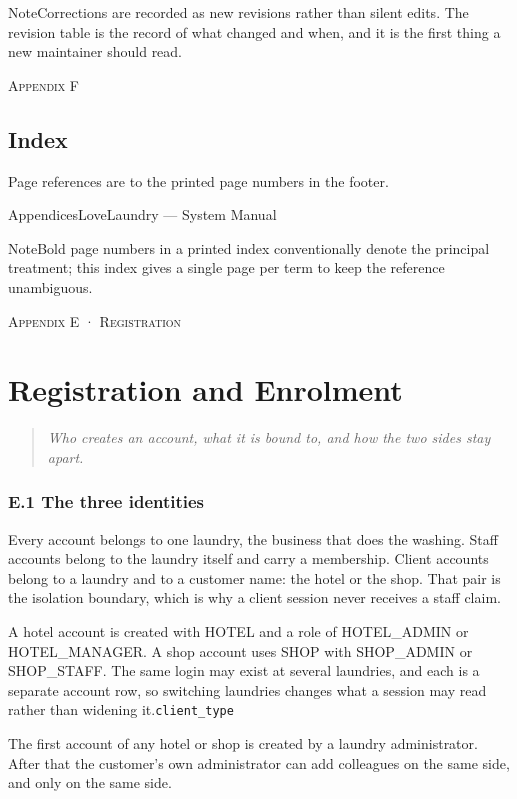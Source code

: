 \documentclass[11pt,a4paper,oneside]{book}
\begin{document}
\begin{notebox}NoteCorrections are recorded as new revisions rather than silent edits. The revision table is the record of what changed and when, and it is the first thing a new maintainer should read.\end{notebox}
\textsc{\small\color{crimson}Appendix F}\par\medskip
\section*{Index}
Page references are to the printed page numbers in the footer.

AppendicesLoveLaundry — System Manual

\begin{notebox}NoteBold page numbers in a printed index conventionally denote the principal treatment; this index gives a single page per term to keep the reference unambiguous.\end{notebox}
\textsc{\small\color{crimson}Appendix E · Registration}\par\medskip
\chapter{Registration and Enrolment}
\begin{quote}\itshape Who creates an account, what it is bound to, and how the two sides stay apart.\end{quote}
\subsection*{E.1 The three identities}
Every account belongs to one laundry, the business that does the washing. Staff accounts belong to the laundry itself and carry a membership. Client accounts belong to a laundry and to a customer name: the hotel or the shop. That pair is the isolation boundary, which is why a client session never receives a staff claim.

A hotel account is created with  HOTEL and a role of HOTEL\_ADMIN or HOTEL\_MANAGER. A shop account uses SHOP with SHOP\_ADMIN or SHOP\_STAFF. The same login may exist at several laundries, and each is a separate account row, so switching laundries changes what a session may read rather than widening it.\texttt{client\_type}

The first account of any hotel or shop is created by a laundry administrator. After that the customer’s own administrator can add colleagues on the same side, and only on the same side.
\end{document}
